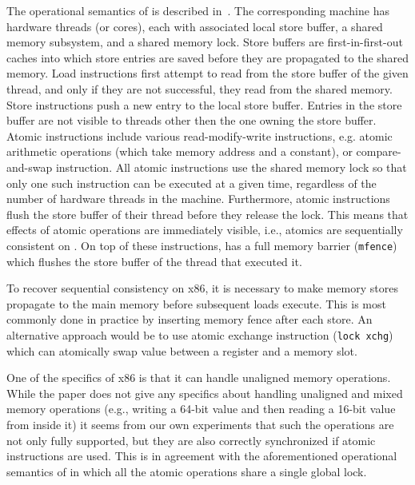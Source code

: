 The operational semantics of \xtso is described in~.
The corresponding machine has hardware threads (or cores), each with associated
local store buffer, a shared memory subsystem, and a shared memory lock.
Store buffers are first-in-first-out caches into which store entries are saved
before they are propagated to the shared memory.
Load instructions first attempt to read from the store buffer of the given
thread, and only if they are not successful, they read from the shared memory.
Store instructions push a new entry to the local store buffer.
Entries in the store buffer are not visible to threads other then the one
owning the store buffer.
Atomic instructions include various read-modify-write instructions, e.g. atomic
arithmetic operations (which take memory address and a constant),
or compare-and-swap instruction.
All atomic instructions use the shared memory lock so that only one such
instruction can be executed at a given time, regardless of the number of
hardware threads in the machine.
Furthermore, atomic instructions flush the store buffer of their thread before
they release the lock.
This means that effects of atomic operations are immediately visible, i.e.,
atomics are sequentially consistent on \xtso.
On top of these instructions, \xtso has a full memory barrier (\texttt{mfence})
which flushes the store buffer of the thread that executed it.

To recover sequential consistency on x86, it is necessary to make memory stores
propagate to the main memory before subsequent loads execute.
This is most commonly done in practice by inserting memory fence after each
store.
An alternative approach would be to use atomic exchange instruction
(\texttt{lock xchg}) which can atomically swap value between a register and a
memory slot.

One of the specifics of x86 is that it can handle unaligned memory
operations.
While the \xtso paper does not give any specifics about handling unaligned and
mixed memory operations (e.g., writing a 64-bit value and then reading a 16-bit
value from inside it) it seems from our own experiments that such the
operations are not only fully supported, but they are also correctly
synchronized if atomic instructions are used.
This is in agreement with the aforementioned operational semantics of \xtso in
which all the atomic operations share a single global lock.

